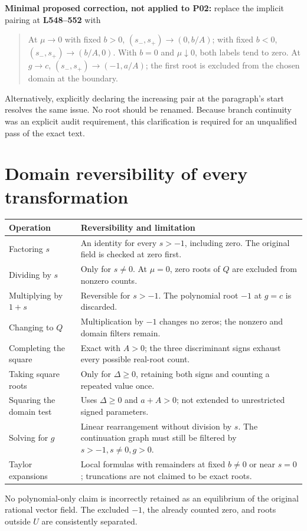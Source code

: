 \documentclass[11pt]{article}
\newcommand{\lin}[1]{\textbf{L#1}}
\begin{document}
\textbf{Minimal proposed correction, not applied to P02:}
replace the implicit pairing at \lin{548--552} with
\begin{quote}
At \(\mu\to0\) with fixed \(b>0\),
\((s_-,s_+)\to(0,b/A)\); with fixed \(b<0\),
\((s_-,s_+)\to(b/A,0)\). With \(b=0\) and \(\mu\downarrow0\),
both labels tend to zero. At \(g\to c\),
\((s_-,s_+)\to(-1,a/A)\); the first root is excluded from the
chosen domain at the boundary.
\end{quote}
Alternatively, explicitly declaring the increasing pair at the
paragraph's start resolves the same issue. No root should be renamed.
Because branch continuity was an explicit audit requirement,
this clarification is required for an unqualified pass of the exact text.

\section{Domain reversibility of every transformation}

\begin{longtable}{@{}P{0.26\textwidth}P{0.66\textwidth}@{}}
\toprule
Operation & Reversibility and limitation\\
\midrule
\endhead
Factoring \(s\) & An identity for every \(s>-1\), including zero.
The original field is checked at zero first.\\
Dividing by \(s\) & Only for \(s\ne0\).
At \(\mu=0\), zero roots of \(Q\) are excluded from nonzero counts.\\
Multiplying by \(1+s\) & Reversible for \(s>-1\).
The polynomial root \(-1\) at \(g=c\) is discarded.\\
Changing to \(Q\) & Multiplication by \(-1\) changes no zeros;
the nonzero and domain filters remain.\\
Completing the square & Exact with \(A>0\); the three discriminant
signs exhaust every possible real-root count.\\
Taking square roots & Only for \(\Delta\ge0\), retaining both signs
and counting a repeated value once.\\
Squaring the domain test & Uses \(\Delta\ge0\) and \(a+A>0\);
not extended to unrestricted signed parameters.\\
Solving for \(g\) & Linear rearrangement without division by \(s\).
The continuation graph must still be filtered by \(s>-1,s\ne0,g>0\).\\
Taylor expansions & Local formulas with remainders at fixed \(b\ne0\)
or near \(s=0\); truncations are not claimed to be exact roots.\\
\bottomrule
\end{longtable}
No polynomial-only claim is incorrectly retained as an equilibrium
of the original rational vector field. The excluded \(-1\), the
already counted zero, and roots outside \(U\) are consistently separated.
\end{document}
